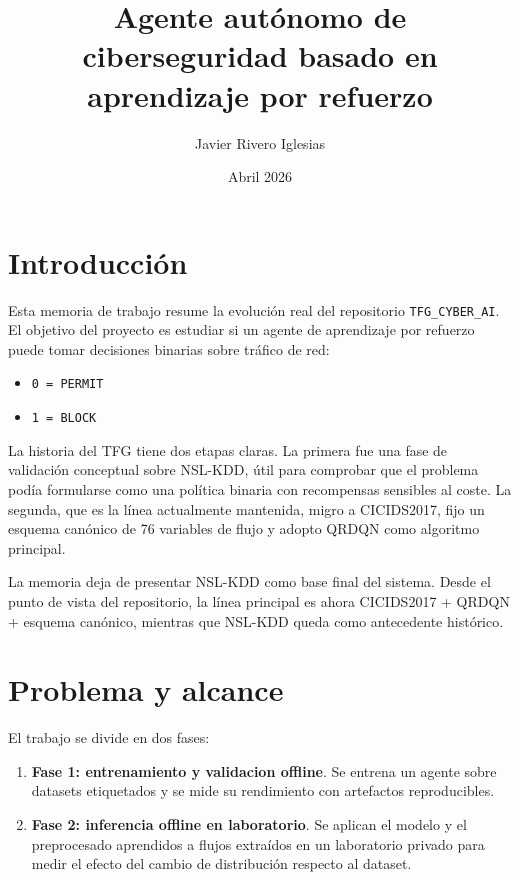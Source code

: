 \documentclass[12pt,a4paper]{report}
\title{Agente autónomo de ciberseguridad basado en aprendizaje por refuerzo}
\author{Javier Rivero Iglesias}
\date{Abril 2026}
\begin{document}
\maketitle
\tableofcontents

\chapter{Introducción}

Esta memoria de trabajo resume la evolución real del repositorio \texttt{TFG\_CYBER\_AI}.
El objetivo del proyecto es estudiar si un agente de aprendizaje por refuerzo puede
tomar decisiones binarias sobre tráfico de red:

\begin{itemize}
    \item \texttt{0 = PERMIT}
    \item \texttt{1 = BLOCK}
\end{itemize}

La historia del TFG tiene dos etapas claras. La primera fue una fase de validación
conceptual sobre NSL-KDD, útil para comprobar que el problema podía formularse como
una política binaria con recompensas sensibles al coste. La segunda, que es la línea
actualmente mantenida, migro a CICIDS2017, fijo un esquema canónico de 76 variables
de flujo y adopto QRDQN como algoritmo principal.

La memoria deja de presentar NSL-KDD como base final del sistema. Desde el punto de
vista del repositorio, la línea principal es ahora CICIDS2017 + QRDQN + esquema
canónico, mientras que NSL-KDD queda como antecedente histórico.

\chapter{Problema y alcance}

El trabajo se divide en dos fases:

\begin{enumerate}[label=\textbf{F\arabic*.}, leftmargin=*]
    \item \textbf{Fase 1: entrenamiento y validacion offline}. Se entrena un agente
    sobre datasets etiquetados y se mide su rendimiento con artefactos reproducibles.

    \item \textbf{Fase 2: inferencia offline en laboratorio}. Se aplican el modelo y
    el preprocesado aprendidos a flujos extraídos en un laboratorio privado para medir
    el efecto del cambio de distribución respecto al dataset.
\end{enumerate}
\end{document}
